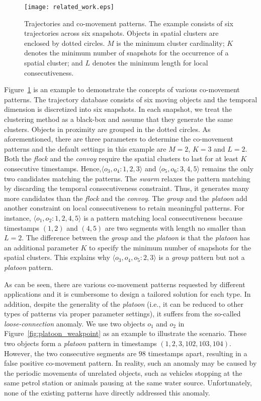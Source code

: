 \begin{figure}[h]
\centering
\texttt{[image: related\_work.eps]}
\caption{Trajectories and co-movement patterns. The example consists of six trajectories across six snapshots. Objects in spatial clusters are enclosed by dotted circles. $M$ is the minimum cluster cardinality; $K$ denotes the minimum number of snapshots for the occurrence of a spatial cluster; and $L$ denotes the minimum length for local consecutiveness.}
\label{fig:related_work}
\end{figure}

Figure~\ref{fig:related_work} is an example to demonstrate the concepts of various co-movement patterns. The trajectory database consists of six moving objects and the temporal dimension is discretized into six snapshots. In each snapshot, we treat the clustering method as a black-box and assume that they generate the same clusters. Objects in proximity are grouped in the dotted circles. As aforementioned, there are three parameters to determine the co-movement patterns and the default settings in this example are $M=2$, $K=3$ and $L=2$. Both the \emph{flock} and the \emph{convoy} require the spatial clusters to last for at least $K$ consecutive  timestamps. Hence,$\langle o_3,o_4:1,2,3 \rangle$ and $\langle o_5,o_6:3,4,5 \rangle$  remains the only two candidates matching the patterns. The \textit{swarm} relaxes the pattern matching by discarding the temporal consecutiveness constraint. Thus, it generates many more candidates than the \textit{flock} and the \textit{convoy}. The \textit{group} and the \textit{platoon} add another constraint on local consecutiveness to retain meaningful patterns. For instance, $\langle o_1,o_2:1,2,4,5 \rangle$ is a pattern matching local consecutiveness because timestamps $(1,2)$ and $(4,5)$ are two segments with length no smaller than $L=2$. The difference between the \textit{group} and the \textit{platoon} is that the \textit{platoon} has an additional parameter $K$ to specify the minimum number of snapshots for the spatial clusters. This explains why $\langle o_3,o_4,o_5:2,3 \rangle$ is a  \textit{group} pattern but not a \textit{platoon} pattern.

As can be seen, there are various co-movement patterns requested by different applications and it is cumbersome to design a tailored solution for each type. In addition, despite the generality of the \emph{platoon} (i.e., it can be reduced to other types of patterns via proper parameter settings), it suffers from the so-called \emph{loose-connection} anomaly. We use two objects $o_1$ and $o_2$ in Figure~\ref{fig:platoon_weakpoint} as an example to illustrate the scenario. These two objects form a \emph{platoon} pattern in timestamps $(1,2,3,102,103,104)$. However, the two consecutive segments are $98$ timestamps apart, resulting in a false positive co-movement pattern. In reality, such an anomaly may be caused  by the periodic movements of unrelated objects, such as vehicles stopping at the same petrol station or animals pausing at the same water source. 
Unfortunately, none of the existing patterns have directly addressed this anomaly.


